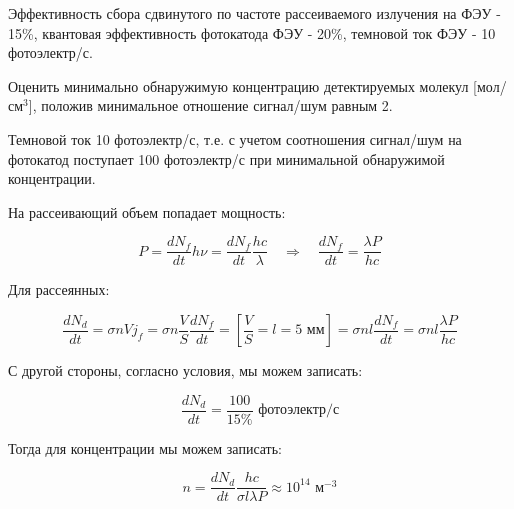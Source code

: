 \documentclass[a4paper, 12pt]{article}
\newcommand{\qrq}
{\ensuremath{\quad \Rightarrow \quad}} %
\begin{document}
Эффективность сбора сдвинутого по частоте рассеиваемого излучения на ФЭУ - 15\%, квантовая эффективность фотокатода ФЭУ - 20\%, темновой ток ФЭУ - 10 фотоэлектр/с.

Оценить минимально обнаружимую концентрацию детектируемых молекул [мол/см$^3$], положив минимальное отношение сигнал/шум равным 2.

Темновой ток 10 фотоэлектр/с, т.е. с учетом соотношения сигнал/шум на фотокатод поступает 100 фотоэлектр/с при минимальной обнаружимой концентрации.

На рассеивающий объем попадает мощность:

\begin{equation}
	P = \frac{dN_f}{dt} h\nu = \frac{dN_f}{dt} \frac{hc}{\lambda} \qrq \frac{dN_f}{dt} = \frac{\lambda P}{h c}
\end{equation}

Для рассеянных:

\begin{equation}
	\frac{dN_d}{dt} = \sigma n V j_f = \sigma n \frac{V}{S} \frac{dN_f}{dt} = \left[\frac{V}{S} = l = 5 \text{ мм}\right] = \sigma n l \frac{dN_f}{dt} = \sigma n l \frac{\lambda P}{h c}
\end{equation}

С другой стороны, согласно условия, мы можем записать:

\begin{equation}
	\frac{dN_d}{dt} = \frac{100}{15\%} \text{ фотоэлектр/с}
\end{equation}

Тогда для концентрации мы можем записать:

\begin{equation}
	n = \frac{dN_d}{dt} \frac{hc}{\sigma l \lambda P} \approx 10^{14} \text{ м}^{-3}
\end{equation}
\end{document}

